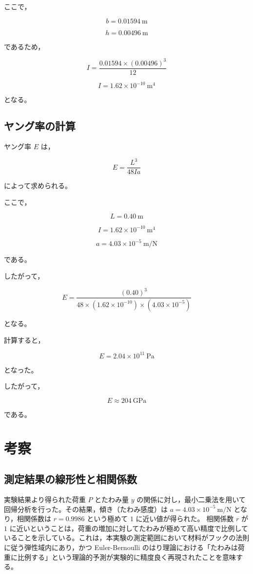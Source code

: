 \documentclass[10pt,a4paper,titlepage]{jreport}
\begin{document}
ここで，

\[
b = 0.01594\ \mathrm{m}
\]

\[
h = 0.00496\ \mathrm{m}
\]

であるため，

\[
I=
\frac{0.01594\times(0.00496)^3}{12}
\]

\[
I = 1.62\times10^{-10}\ \mathrm{m^4}
\]

となる。

\section{ヤング率の計算}

ヤング率 $E$ は，

\begin{equation}
E=\frac{L^3}{48Ia}
\end{equation}

によって求められる。

ここで，

\[
L = 0.40\ \mathrm{m}
\]

\[
I = 1.62\times10^{-10}\ \mathrm{m^4}
\]

\[
a = 4.03\times10^{-5}\ \mathrm{m/N}
\]

である。

したがって，

\[
E=
\frac{(0.40)^3}
{48\times(1.62\times10^{-10})\times(4.03\times10^{-5})}
\]

となる。

計算すると，

\[
E = 2.04\times10^{11}\ \mathrm{Pa}
\]

となった。

したがって，

\[
E \approx 204\ \mathrm{GPa}
\]

である。

\chapter{考察}

\section{測定結果の線形性と相関係数}
実験結果より得られた荷重 $P$ とたわみ量 $y$ の関係に対し，最小二乗法を用いて回帰分析を行った。その結果，傾き（たわみ感度）は $a = 4.03 \times 10^{-5}\ \mathrm{m/N}$ となり，相関係数は $r = 0.9986$ という極めて $1$ に近い値が得られた。
相関係数 $r$ が $1$ に近いということは，荷重の増加に対してたわみが極めて高い精度で比例していることを示している。これは，本実験の測定範囲において材料がフックの法則に従う弾性域内にあり，かつ Euler-Bernoulli のはり理論における「たわみは荷重に比例する」という理論的予測が実験的に精度良く再現されたことを意味する。
\end{document}
